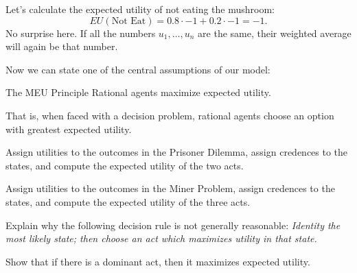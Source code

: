 Let's calculate the expected utility of not eating the mushroom:
\[
EU(\text{Not Eat}) = 0.8 \cdot -1 + 0.2 \cdot -1 = -1.
\]
No surprise here. If all the numbers $u_1,\ldots,u_n$ are the same,
their weighted average will again be that number.

Now we can state one of the central assumptions of our model:

\begin{genericthm}{The MEU Principle}
  Rational agents maximize expected utility. 
\end{genericthm}
%
That is, when faced with a decision problem, rational agents choose an
option with greatest expected utility.


\begin{exercise}
  Assign utilities to the outcomes in the Prisoner Dilemma, assign
  credences to the states, and compute the expected utility of the two
  acts.
\end{exercise}

\begin{exercise}
  Assign utilities to the outcomes in the Miner Problem, assign
  credences to the states, and compute the expected utility of the
  three acts.
\end{exercise}

\begin{exercise}
  Explain why the following decision rule is not generally reasonable:
  \emph{Identity the most likely state; then choose an act which
    maximizes utility in that state.}
\end{exercise}

\begin{exercise}
  Show that if there is a dominant act, then it maximizes
  expected utility.
\end{exercise}


